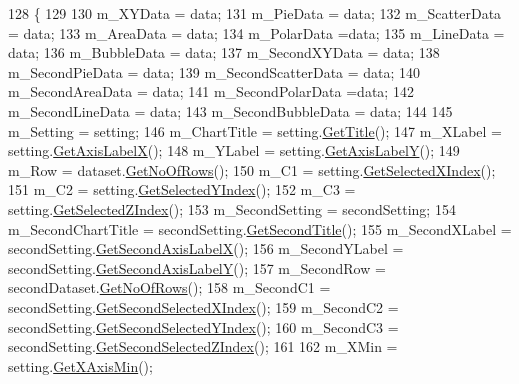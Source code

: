 \begin{DoxyCode}
128                                          \{
129 
130           m\_XYData = data;
131           m\_PieData = data;
132           m\_ScatterData = data; 
133           m\_AreaData = data; 
134           m\_PolarData =data;
135           m\_LineData = data;
136           m\_BubbleData = data;
137           m\_SecondXYData = data;
138           m\_SecondPieData = data;
139           m\_SecondScatterData = data; 
140           m\_SecondAreaData = data; 
141           m\_SecondPolarData =data;
142           m\_SecondLineData = data;
143           m\_SecondBubbleData = data;
144           
145           m\_Setting = setting;
146           m\_ChartTitle = setting.\hyperlink{class_data_attribute_ade9747a192ba22fe1020e874bff6a48c}{GetTitle}();
147           m\_XLabel = setting.\hyperlink{class_data_attribute_aecb451704a87d77dd80dbad8a19099d1}{GetAxisLabelX}();
148           m\_YLabel = setting.\hyperlink{class_data_attribute_af5f68794cd0195d42135d5e48120ccc0}{GetAxisLabelY}();
149           m\_Row = dataset.\hyperlink{class_dataset_a91257a605317576e87e1c32e54739e51}{GetNoOfRows}();
150           m\_C1 = setting.\hyperlink{class_data_attribute_a0f4a54973bc44b0526f78bda945dc81b}{GetSelectedXIndex}();
151           m\_C2 = setting.\hyperlink{class_data_attribute_a82e7519853d9f470ea183dd0c39a03d6}{GetSelectedYIndex}();
152           m\_C3 = setting.\hyperlink{class_data_attribute_a802ca8ea739cff583380ea27647250c7}{GetSelectedZIndex}();
153           m\_SecondSetting = secondSetting;
154           m\_SecondChartTitle = secondSetting.\hyperlink{class_data_attribute_a4079522c93025fce7569eaed585f4aeb}{GetSecondTitle}();
155           m\_SecondXLabel = secondSetting.\hyperlink{class_data_attribute_a8ace4cb1fee9e2abeabe3efc9a190c8f}{GetSecondAxisLabelX}();
156           m\_SecondYLabel = secondSetting.\hyperlink{class_data_attribute_a6efb7e067317898feefbbf6bd472b998}{GetSecondAxisLabelY}();
157           m\_SecondRow = secondDataset.\hyperlink{class_dataset_a91257a605317576e87e1c32e54739e51}{GetNoOfRows}();
158           m\_SecondC1 = secondSetting.\hyperlink{class_data_attribute_a7f501790eee650ddf9ac17c4f63a3995}{GetSecondSelectedXIndex}();
159           m\_SecondC2 = secondSetting.\hyperlink{class_data_attribute_a6f61ad05915f4aa31ad3dba00596da64}{GetSecondSelectedYIndex}();
160           m\_SecondC3 = secondSetting.\hyperlink{class_data_attribute_ab8aad538c86b04b4b9a962b7e07e6bc3}{GetSecondSelectedZIndex}();      
161            
162           m\_XMin = setting.\hyperlink{class_data_attribute_afa9da883abc4abad5f64c045de114c50}{GetXAxisMin}();

\end{DoxyCode}
